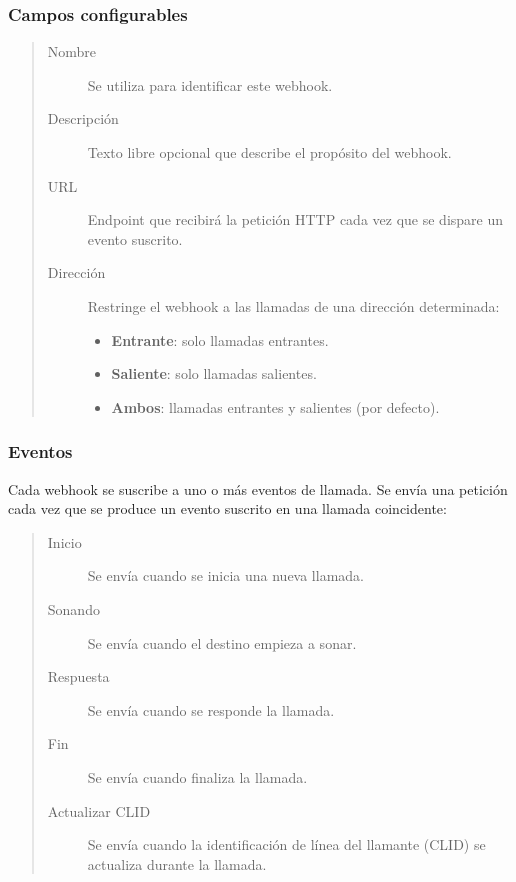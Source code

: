 \documentclass[letterpaper,10pt,spanish]{sphinxmanual}
\begin{document}
\subsubsection{Campos configurables}
\label{administration_portal/brand/calls/webhooks:configurable-fields}\begin{quote}
\begin{description}
\item[{Nombre}] \leavevmode
Se utiliza para identificar este webhook.

\item[{Descripción}] \leavevmode
Texto libre opcional que describe el propósito del webhook.

\item[{URL}] \leavevmode
Endpoint que recibirá la petición HTTP  cada vez que se dispare un evento suscrito.

\item[{Dirección}] \leavevmode
Restringe el webhook a las llamadas de una dirección determinada:
\begin{itemize}
\item {} 
\textbf{Entrante}: solo llamadas entrantes.

\item {} 
\textbf{Saliente}: solo llamadas salientes.

\item {} 
\textbf{Ambos}: llamadas entrantes y salientes (por defecto).

\end{itemize}

\end{description}
\end{quote}


\subsubsection{Eventos}
\label{administration_portal/brand/calls/webhooks:events}
Cada webhook se suscribe a uno o más eventos de llamada. Se envía una petición  cada vez que se produce un evento suscrito en una llamada coincidente:
\begin{quote}
\begin{description}
\item[{Inicio}] \leavevmode
Se envía cuando se inicia una nueva llamada.

\item[{Sonando}] \leavevmode
Se envía cuando el destino empieza a sonar.

\item[{Respuesta}] \leavevmode
Se envía cuando se responde la llamada.

\item[{Fin}] \leavevmode
Se envía cuando finaliza la llamada.

\item[{Actualizar CLID}] \leavevmode
Se envía cuando la identificación de línea del llamante (CLID) se actualiza durante la llamada.

\end{description}
\end{quote}
\end{document}
